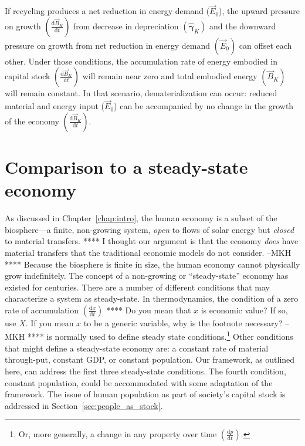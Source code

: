 If recycling produces a net reduction in energy demand ($\vec{E}_{0}$), 
the upward pressure on growth 
$\left(\frac{\mathrm{d}\vec{B}_{K}}{\mathrm{d}t}\right)$ 
from decrease in depreciation 
$\left(\hat{\boldsymbol{\gamma}}_{K}\right)$ 
and the downward pressure on growth 
from net reduction in energy demand 
$\left(\vec{E}_{0}\right)$ 
can offset each other.
Under those conditions, 
the accumulation rate of energy embodied in capital stock
$\left(\frac{\mathrm{d}\vec{B}_{K}}{\mathrm{d}t}\right)$ 
will remain near zero 
and total embodied energy 
$(\vec{B}_{K})$ will remain constant. 
In that scenario, 
dematerialization can occur: 
reduced material and energy input ($\vec{E}_{0}$) 
can be accompanied by 
no change in
the growth of the economy
$\left(\frac{\mathrm{d}\vec{B}_{K}}{\mathrm{d}t}\right)$.


\section{Comparison to a steady-state economy}
\label{sec:SSE}

As discussed in Chapter~\ref{chap:intro},
the human economy is a subset of the biosphere---a
finite, non-growing system,
\emph{open} to flows of solar energy but \emph{closed}
to material transfers.
**** I thought our argument is that the economy \emph{does}
have material transfers that the traditional economic models 
do not consider. --MKH ****
Because the biosphere is finite in size,
the human economy cannot physically grow indefinitely.
The concept of a non-growing or ``steady-state'' economy
has existed for centuries.
There are a number of different
conditions that may characterize a system as steady-state.
In thermodynamics,
the condition of a zero rate of accumulation
$\left(\frac{\mathrm{d}x}{\mathrm{d}t}\right)$
**** Do you mean that $x$ is economic value? 
If so, use $X$.
If you mean $x$ to be a generic variable, 
why is the footnote necessary? --MKH ****
is normally used to define steady state conditions.\footnote{Or,
more generally,
a change in any property over time
$\left(\frac{\mathrm{d}p}{\mathrm{d}t}\right)$.}
Other conditions that might define a steady-state
economy are:
a constant rate of material through-put,
constant GDP, or constant population.
Our framework,
as outlined here,
can address the first three steady-state conditions.
The fourth condition, constant population, could be
accommodated with some adaptation of the 
framework. 
The issue of human population as part of society's
capital stock is addressed in Section~\ref{sec:people_as_stock}.


